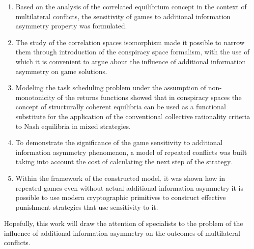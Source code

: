 \begin{enumerate}
	\item Based on the analysis of the correlated equilibrium concept in the context of multilateral conflicts, the sensitivity of games to additional information asymmetry property was formulated. %
	\item The study of the correlation spaces isomorphism made it possible to narrow them through introduction of the conspiracy space formalism, with the use of which it is convenient to argue about the influence of additional information asymmetry on game solutions. %
	\item Modeling the task scheduling problem under the assumption of non-monotonicity of the returns functions showed that in conspiracy spaces the concept of structurally coherent equilibria can be used as a functional substitute for the application of the conventional collective rationality criteria to Nash equilibria in mixed strategies. %
	\item To demonstrate the significance of the game sensitivity to additional information asymmetry phenomenon, a model of repeated conflicts was built taking into account the cost of calculating the next step of the strategy. %
	\item Within the framework of the constructed model, it was shown how in repeated games even without actual additional information asymmetry it is possible to use modern cryptographic primitives to construct effective punishment strategies that use sensitivity to it. %
\end{enumerate}
Hopefully, this work will draw the attention of specialists to the problem of the influence of additional information asymmetry on the outcomes of multilateral conflicts. %

